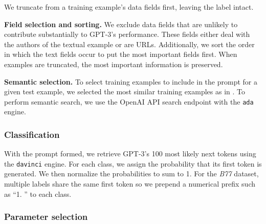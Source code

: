 \documentclass{article}
\begin{document}
We truncate from a training example's data fields first, leaving the label intact.

\textbf{Field selection and sorting.} We exclude data fields that are unlikely to contribute substantially to GPT-3's performance. These fields either deal with the authors of the textual example or are URLs. Additionally, we sort the order in which the text fields occur to put the most important fields first. When examples are truncated, the most important information is preserved. 

\begin{comment}
Don't think this table was adding much and we're low on space
\begin{table}[h]
\centering
\begin{tabular}{l l}
\toprule
\textbf{Labeled} & \textbf{Unlabeled} \\
\midrule
\makecell[l]{Query: Is it possible for me to change my PIN number? \\ Label: change\_pin} & \makecell[l]{Query: where did my funds come from? \\ Label:} \\
\bottomrule
\end{tabular}
\caption{A sample labeled and unlabeled example from \textit{B77}.}
\label{tab:prompt-examples}
\end{table}
\end{comment}

\textbf{Semantic selection.} To select training examples to include in the prompt for a given test example, we selected the most similar training examples as in \citet{liu2021makes}. To perform semantic search, we use the OpenAI API search endpoint with the \texttt{ada} engine.

\subsubsection{Classification}

With the prompt formed, we retrieve GPT-3's 100 most likely next tokens using the \texttt{davinci} engine. For each class, we assign the probability that its first token is generated. We then normalize the probabilities to sum to 1. For the \textit{B77} dataset, multiple labels share the same first token so we prepend a numerical prefix such as ``1. '' to each class.

\subsubsection{Parameter selection}
\label{sec:param-tuning}
\end{document}

